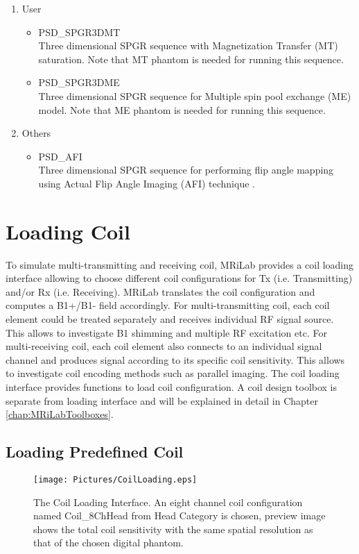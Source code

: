 \documentclass{book}%
\begin{document}
\begin{enumerate}
\item User
\begin{itemize}
	\item PSD\_SPGR3DMT \\
	Three dimensional SPGR sequence with Magnetization Transfer (MT) saturation. Note that MT phantom is needed for running this sequence.
	\item PSD\_SPGR3DME \\
	Three dimensional SPGR sequence for Multiple spin pool exchange (ME) model. Note that ME phantom is needed for running this sequence.
\end{itemize}

\item Others
\begin{itemize}
	\item PSD\_AFI \\
	Three dimensional SPGR sequence for performing flip angle mapping using Actual Flip Angle Imaging (AFI) technique \cite{Yarnykh2007}.
\end{itemize}

\end{enumerate}


\section{Loading Coil}
To simulate multi-transmitting and receiving coil, MRiLab provides a coil loading interface allowing to choose different coil configurations for Tx (i.e. Transmitting) and/or Rx (i.e. Receiving). MRiLab translates the coil configuration and computes a B1+/B1- field accordingly. For multi-transmitting coil, each coil element could be treated separately and receives individual RF signal source. This allows to investigate B1 shimming and multiple RF excitation etc. For multi-receiving coil, each coil element also connects to an individual signal channel and produces signal according to its specific coil sensitivity. This allows to investigate coil encoding methods such as parallel imaging. The coil loading interface provides functions to load coil configuration. A coil design toolbox is separate from loading interface and will be explained in detail in Chapter \ref{chap:MRiLabToolboxes}.

\subsection{Loading Predefined Coil}

\begin{figure}[htbp]
	\centering
		\texttt{[image: Pictures/CoilLoading.eps]}
	\caption{The Coil Loading Interface. An eight channel coil configuration named Coil\_8ChHead from Head Category is chosen, preview image shows the total coil sensitivity with the same spatial resolution as that of the chosen digital phantom.}
	\label{fig:CoilLoading}
\end{figure}
\end{document}
